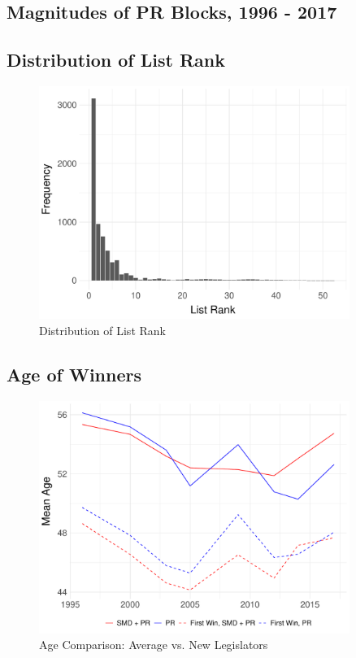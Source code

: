 \documentclass[a4paper, 11pt]{article}
\begin{document}


\newpage

\subsection{Magnitudes of PR Blocks, 1996 - 2017}



\newpage

\subsection{Distribution of List Rank}

\begin{figure}[!htbp]
	\includegraphics[width = 0.9\textwidth]{../figure/paper/pr_rank_distribution.pdf}
	\caption{Distribution of List Rank}
	\label{fig:distRank}
\end{figure}

\newpage

\subsection{Age of Winners}

\begin{figure}[!htbp]
	\includegraphics[width = 0.9\textwidth]{../figure/paper/age_first_win.pdf}
	\caption{Age Comparison: Average vs. New Legislators}
	\label{fig:ageFirstWin}
\end{figure}	
\end{document}
